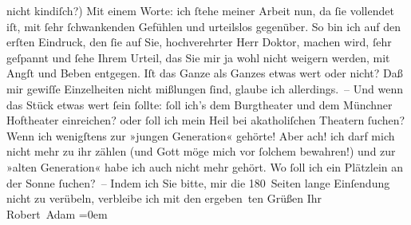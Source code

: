 \begin{ledgroupsized}[t]{13cm}
               nicht kindiſch?) Mit einem Worte: ich ſtehe meiner Arbeit nun, da ſie vollendet iſt,
               mit ſehr ſchwankenden Gefühlen und urteilslos gegenüber.\pend
           \pstart
           So bin ich auf den erſten Eindruck, den ſie auf Sie, hochverehrter Herr Doktor,
               machen wird, ſehr geſpannt und ſehe Ihrem Urteil, das Sie mir ja wohl nicht weigern
               werden, mit Angſt und Beben entgegen. Iſt das Ganze als Ganzes etwas wert oder nicht?
               Daß mir gewiſſe Einzelheiten nicht mißlungen ſind, glaube ich allerdings. –\pend
           \pstart
           Und wenn das Stück etwas wert {\pb}ſein ſollte: ſoll ich’s
               dem Burgtheater und dem Münchner Hoftheater einreichen? oder ſoll ich mein Heil bei
               akatholiſchen Theatern ſuchen?\pend
           \pstart
           Wenn ich wenigſtens zur »jungen Generation« gehörte! Aber ach! ich darf mich nicht
               mehr zu ihr zählen (und Gott möge mich vor ſolchem bewahren!) und zur »alten
               Generation« habe ich auch nicht mehr gehört. Wo ſoll ich ein Plätzlein an der Sonne
               ſuchen? –\pend
           \pstart
           Indem ich Sie bitte, mir die 180 Seiten lange Einſendung nicht zu verübeln,
               verbleibe ich mit den ergeben ten Grüßen Ihr{\\[\baselineskip]}\spacefill\mbox{Robert Adam}\pend
           \leftskip=0em{}
         
         \endnumbering{}\end{ledgroupsized}  \newcommand{\dateiname}{L02275}\newcommand{\titel}{Robert Adam an Arthur Schnitzler, 12. 10. 1917}\newcommand{\editorInnen}{Martin Anton Müller und Gerd-Hermann Susen}
      